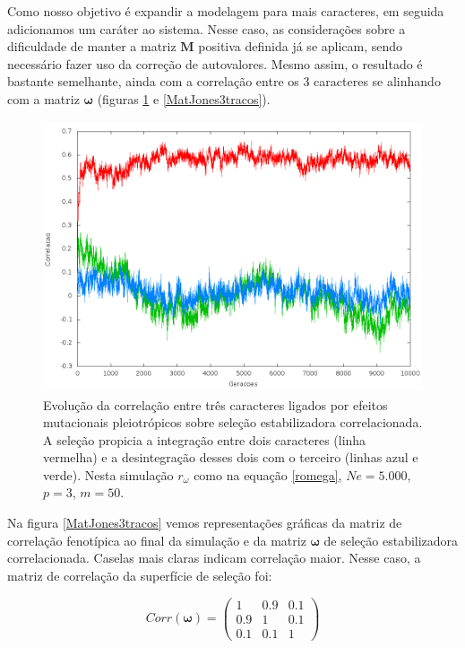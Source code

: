 Como nosso objetivo é expandir a modelagem para mais caracteres, em seguida
adicionamos um caráter ao sistema.
Nesse caso, as considerações sobre a dificuldade de manter a matriz
$\mathbf{M}$
positiva definida já se aplicam, sendo necessário fazer uso da correção
de autovalores.
Mesmo assim, o resultado é bastante semelhante, ainda com a correlação
entre os 3 caracteres se alinhando com a matriz $\pmb{\omega}$ (figuras
\ref{jones3tracos} e \ref{MatJones3tracos}).

\begin{figure}[htbp]
    \centering
    \includegraphics[width=150mm, height=80mm]{figuras/jones3tracos.png}
    \caption{Evolução da correlação entre três caracteres ligados por efeitos
        mutacionais pleiotrópicos sobre seleção estabilizadora correlacionada.
        A seleção propicia a integração entre dois caracteres (linha vermelha) e a desintegração
        desses dois com o terceiro (linhas azul e verde).
        Nesta simulação $r_\omega$ como na equação \ref{romega},
        $Ne=5.000$, $p=3$, $m=50$.}
    \label{jones3tracos}
\end{figure}

Na figura \ref{MatJones3tracos} vemos representações gráficas da matriz
de correlação fenotípica ao final da simulação e da matriz $\pmb{\omega}$ de
seleção estabilizadora correlacionada.
Caselas mais claras indicam correlação maior.
Nesse caso, a matriz de correlação da superfície de seleção foi:

\begin{equation}
    Corr(\pmb{\omega}) = \left( \begin{smallmatrix} 1 & 0.9 & 0.1\\  0.9 & 1 & 0.1 \\ 0.1 & 0.1 & 1 \end{smallmatrix}  \right)
    \label{romega}
\end{equation}


